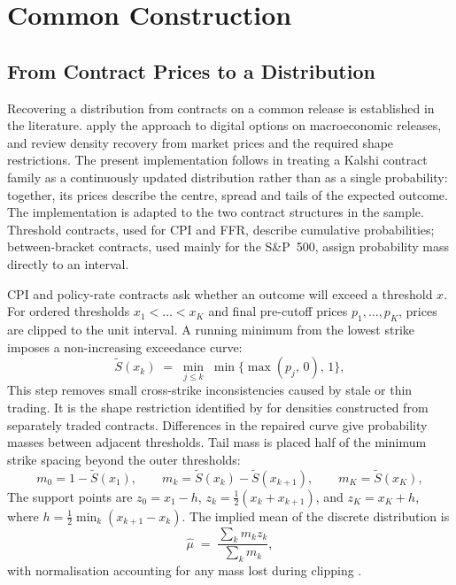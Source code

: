 \documentclass[12pt,a4paper]{report}
\begin{document}
\section{Common Construction}
\label{sec:data-common}

\subsection{From Contract Prices to a Distribution}
\label{sec:data-common-ladder}

Recovering a distribution from contracts on a common release is established in
the literature. \textcite{gurkaynak2006} apply the approach to digital options
on macroeconomic releases, and \textcite{christoffersen2013} review density
recovery from market prices and the required shape restrictions. The present
implementation follows \textcite{diercks2026} in treating a Kalshi contract
family as a continuously updated distribution rather than as a single
probability: together, its prices describe the centre, spread and tails of the
expected outcome. The implementation is adapted to the two contract structures
in the sample. Threshold contracts, used for CPI and FFR, describe cumulative
probabilities; between-bracket contracts, used mainly for the S\&P~500, assign
probability mass directly to an interval.

CPI and policy-rate contracts ask whether an outcome will exceed a threshold
$x$. For ordered thresholds $x_1 < \dots < x_K$ and final pre-cutoff prices
$p_1,\dots,p_K$, prices are clipped to the unit interval. A running minimum
from the lowest strike imposes a non-increasing exceedance curve:
\begin{equation}
\label{eq:survival}
\tilde{S}(x_k) \;=\; \min_{j \le k} \; \min\bigl\{\max(p_j,\,0),\,1\bigr\},
\end{equation}
This step removes small cross-strike inconsistencies caused by stale or thin
trading. It is the shape restriction identified by
\textcite{christoffersen2013} for densities constructed from separately traded
contracts. Differences in the repaired curve give probability masses between
adjacent thresholds. Tail mass is placed half of the minimum strike spacing
beyond the outer thresholds:
\begin{equation}
\label{eq:masses}
m_0 = 1 - \tilde{S}(x_1), \qquad
m_k = \tilde{S}(x_k) - \tilde{S}(x_{k+1}), \qquad
m_K = \tilde{S}(x_K),
\end{equation}
The support points are $z_0 = x_1 - h$, $z_k = \tfrac{1}{2}(x_k + x_{k+1})$,
and $z_K = x_K + h$, where $h = \tfrac{1}{2}\min_k (x_{k+1} - x_k)$. The
implied mean of the discrete distribution is
\begin{equation}
\label{eq:implied-mean}
\hat{\mu} \;=\; \frac{\sum_k m_k z_k}{\sum_k m_k},
\end{equation}
with normalisation accounting for any mass lost during clipping
\parencite{gurkaynak2006}.
\end{document}
